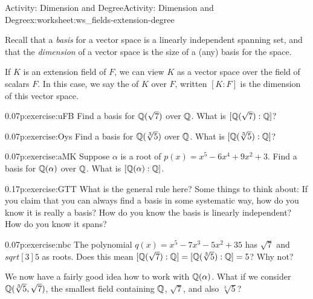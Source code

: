\documentclass[11pt]{book}
\begin{document}
%
%
\typeout{************************************************}
\typeout{************************************************}
%
\begin{worksheet-subsection}{Activity: Dimension and Degree}{}{Activity: Dimension and Degree}{}{}{x:worksheet:ws_fields-extension-degree}
\begin{introduction}{}%
Recall that a \emph{basis} for a vector space is a linearly independent spanning set, and that the \emph{dimension} of a vector space is the size of a (any) basis for the space.%
\par
If \(K\) is an extension field of \(F\), we can view \(K\) as a vector space over the field of scalars \(F\).  In this case, we say the  of \(K\) over \(F\), written \([K:F]\) is the dimension of this vector space.%
\end{introduction}%
\begin{divisionexercise}{1}{}{0.07}{p:exercise:uFB}%
Find a basis for \(\mathbb{Q}(\sqrt{7})\) over \(\mathbb{Q}\).  What is \([\mathbb{Q}(\sqrt{7}):\mathbb{Q}]\)?%
\end{divisionexercise}%
\begin{divisionexercise}{2}{}{0.07}{p:exercise:Oys}%
Find a basis for \(\mathbb{Q}(\sqrt[3]{5})\) over \(\mathbb{Q}\).  What is \([\mathbb{Q}(\sqrt[3]{5}):\mathbb{Q}]\)?%
\end{divisionexercise}%
\begin{divisionexercise}{3}{}{0.07}{p:exercise:aMK}%
Suppose \(\alpha\) is a root of \(p(x) = x^5 -6x^4 + 9x^2 + 3\).  Find a basis for \(\mathbb{Q}(\alpha)\) over \(\mathbb{Q}\).  What is \([\mathbb{Q}(\alpha):\mathbb{Q}]\).%
\end{divisionexercise}%
\begin{divisionexercise}{4}{}{0.17}{p:exercise:GTT}%
What is the general rule here?  Some things to think about: If you claim that you can always find a basis in some systematic way, how do you know it is really a basis?  How do you know the basis is linearly independent?  How do you know it spans?%
\end{divisionexercise}%
\begin{divisionexercise}{5}{}{0.07}{p:exercise:nbc}%
The polynomial \(q(x) = x^5 -7x^3 - 5x^2 + 35\) has \(\sqrt{7}\) and \(sqrt[3]{5}\) as roots.  Does this mean \([\mathbb{Q}(\sqrt{7}):\mathbb{Q}] = [\mathbb{Q}(\sqrt[3]{5}):\mathbb{Q}] = 5\)?  Why not?%
\end{divisionexercise}%
\clearpage
We now have a fairly good idea how to work with \(\mathbb{Q}(\alpha)\).  What if we consider \(\mathbb{Q}(\sqrt[3]{5}, \sqrt{7})\), the smallest field containing \(\mathbb{Q}\), \(\sqrt{7}\), and also \(\sqrt[3]{5}\)?%

\end{worksheet-subsection}
\end{document}
